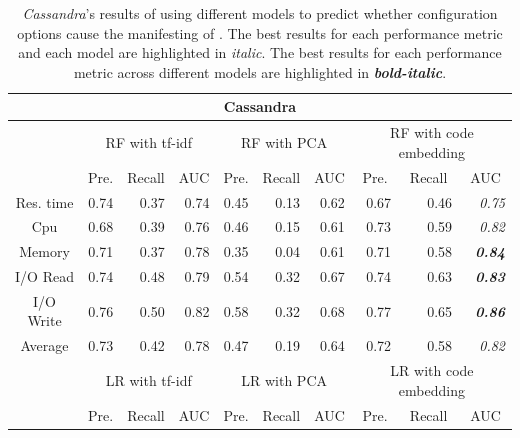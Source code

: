 \documentclass[10pt,journal,compsoc]{IEEEtran}
\begin{document}
\begin{table}
\centering
\caption{\emph{Cassandra}'s results of using different models to predict whether configuration options cause the manifesting of \inconsistent. The best results for each performance metric and each model are highlighted in \textit{italic}. The best results for each performance metric across different models are highlighted in \textbf{\textit{bold-italic}}.}
\begin{tabular}{|c|r|r|r|r|r|r|r|r|r|}
\hline
\multicolumn{10}{|c|}{Cassandra}          \\ \hline
\multirow{2}{*}{} & \multicolumn{3}{c|}{RF with tf-idf}      & \multicolumn{3}{c|}{RF with PCA}         & \multicolumn{3}{c|}{RF with code embedding}                   \\ \cline{2-10} 
                  & \multicolumn{1}{c|}{Pre.} & \multicolumn{1}{c|}{Recall} & \multicolumn{1}{c|}{AUC} & \multicolumn{1}{c|}{Pre.} & \multicolumn{1}{c|}{Recall} & \multicolumn{1}{c|}{AUC} & \multicolumn{1}{c|}{Pre.} & \multicolumn{1}{c|}{Recall} & \multicolumn{1}{c|}{AUC} \\ \hline
Res. time         & 0.74 & 0.37   & 0.74& 0.45 & 0.13   & 0.62& 0.67 & 0.46   & \textit{0.75}            \\ \hline
Cpu               & 0.68 & 0.39   & 0.76& 0.46 & 0.15   & 0.61& 0.73 & 0.59   & \textit{0.82}            \\ \hline
Memory            & 0.71 & 0.37   & 0.78& 0.35 & 0.04   & 0.61& 0.71 & 0.58   & \textit{\textbf{0.84}}   \\ \hline
I/O Read          & 0.74 & 0.48   & 0.79& 0.54 & 0.32   & 0.67& 0.74 & 0.63   & \textit{\textbf{0.83}}   \\ \hline
I/O Write         & 0.76 & 0.50   & 0.82& 0.58 & 0.32   & 0.68& 0.77 & 0.65   & \textit{\textbf{0.86}}   \\ \hline
Average           & 0.73 & 0.42   & 0.78& 0.47 & 0.19   & 0.64& 0.72 & 0.58   & \textit{0.82}            \\ \hline
\multirow{2}{*}{} & \multicolumn{3}{c|}{LR with tf-idf}      & \multicolumn{3}{c|}{LR with PCA}         & \multicolumn{3}{c|}{LR with code embedding}                   \\ \cline{2-10} 
                  & \multicolumn{1}{c|}{Pre.} & \multicolumn{1}{c|}{Recall} & \multicolumn{1}{c|}{AUC} & \multicolumn{1}{c|}{Pre.} & \multicolumn{1}{c|}{Recall} & \multicolumn{1}{c|}{AUC} & \multicolumn{1}{c|}{Pre.} & \multicolumn{1}{c|}{Recall} & \multicolumn{1}{c|}{AUC} \\ \hline

\end{tabular}
\end{table}
\end{document}
